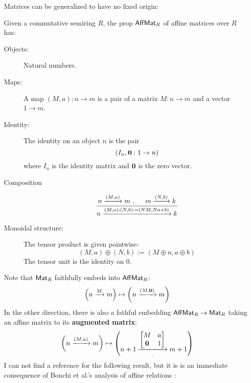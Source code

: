 Matrices can be generalized to have no fixed origin:
\begin{definition}
\label{def:affmat}
Given a commutative semiring $R$, the prop $\mathsf{Aff}\mathsf{Mat}_R$ of affine matrices over $R$ has:
\begin{description}
\item[Objects:] Natural numbers.
\item[Maps:] A map $(M,a):n\to m$ is a pair of a matrix $M:n\to m$ and a vector $1\to m$.
\item[Identity:] The identity on an object $n$ is the pair
$$(I_n,{\bf 0}:1\to n)$$
 where $I_n$ is the identity matrix and $\bf 0$ is the zero vector.
\item[Composition]
$$
\dfrac{
n \xrightarrow{(M,a)} m\ , \hspace*{.5cm} m \xrightarrow {(N,b)} k
}{
n \xrightarrow{(M,a);(N,b):=(NM, Na+b)} k
}
$$
\item[Monoidal structure:]  The tensor product is given pointwise:
 $$(M,a)\oplus (N,b):=(M\oplus n, a\oplus b)$$ 
The tensor unit is the identity on $0$.
\end{description}
\end{definition}
Note that  $\mathsf{Mat}_R$ faithfully embeds into $\mathsf{Aff}\mathsf{Mat}_R$:
$$
\left(n \xrightarrow{M} m\right)
\mapsto 
\left(n \xrightarrow{(M,{\bf 0})} m\right)
$$
In the other direction, there is also a fathful embedding $\mathsf{Aff}\mathsf{Mat}_R\to \mathsf{Mat}_R$ taking an affine matrix to its {\bf augmented matrix}:
$$
\left(n\xrightarrow{(M,a)} m\right)
\mapsto
\left(
\vcenter{\hbox{$\displaystyle{
n+1
\xrightarrow[ . ]{
\begin{bmatrix}
M & a\\
\mathbf{0} & 1
\end{bmatrix}}
m+1}$}}
\right)
$$
I can not find a reference for the following result, but it is is an immediate consequence of Bonchi et al.'s analysis of affine relations  \cite{affine}:
